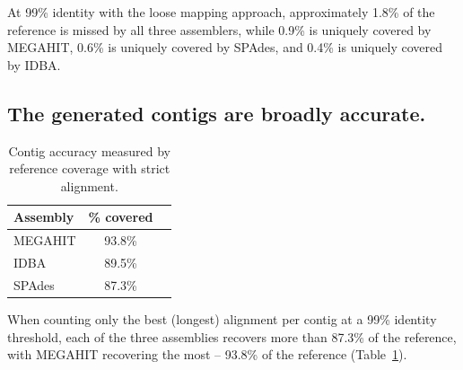 \documentclass[11pt]{article}
\begin{document}
At 99\% identity with the loose mapping approach, approximately 1.8\%
of the reference is missed by all three assemblers, while 0.9\% is
uniquely covered by MEGAHIT, 0.6\% is uniquely covered by SPAdes, and
0.4\% is uniquely covered by IDBA.

%
%


\subsection*{The generated contigs are broadly accurate.} 



\begin{table}[!h]
\centering
\caption{Contig accuracy measured by reference coverage with strict alignment.}
\begin{tabular}{|l|c|c|}\hline
\textbf{Assembly} & \textbf {\% covered}
  \\ \hline
MEGAHIT & 93.8\% \\ \hline
IDBA & 89.5\% \\ \hline
SPAdes &  87.3\% \\ \hline
\end{tabular}
\label{table:contig-accuracy}
\end{table}

When counting only the best (longest) alignment per contig at a 99\%
identity threshold, each of the three assemblies recovers more than 87.3\% of the
reference, with MEGAHIT recovering the most -- 93.8\% of the reference
(Table~\ref{table:contig-accuracy}).

\end{document}
